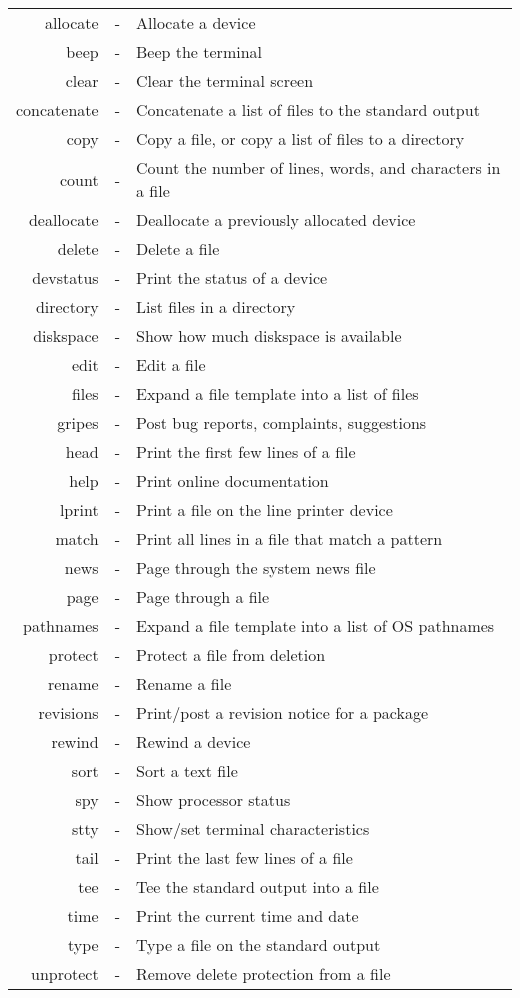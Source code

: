 \begin{tabular}{rcl}

       allocate & - & Allocate a device \\
	   beep & - & Beep the terminal \\
	  clear & - & Clear the terminal screen \\
    concatenate & - & Concatenate a list of files to the standard output \\
	   copy & - & Copy a file, or copy a list of files to a directory \\
	  count & - & Count the number of lines, words, and characters in a file \\
     deallocate & - & Deallocate a previously allocated device \\
         delete & - & Delete a file \\
      devstatus & - & Print the status of a device \\
      directory & - & List files in a directory \\
      diskspace & - & Show how much diskspace is available \\
	   edit & - & Edit a file \\
	  files & - & Expand a file template into a list of files \\
         gripes & - & Post bug reports, complaints, suggestions \\
	   head & - & Print the first few lines of a file \\
           help & - & Print online documentation \\
         lprint & - & Print a file on the line printer device \\
	  match & - & Print all lines in a file that match a pattern \\
	   news & - & Page through the system news file \\
	   page & - & Page through a file \\
      pathnames & - & Expand a file template into a list of OS pathnames \\
        protect & - & Protect a file from deletion \\
         rename & - & Rename a file \\
      revisions & - & Print/post a revision notice for a package \\
         rewind & - & Rewind a device \\
	   sort & - & Sort a text file \\
	    spy & - & Show processor status \\
	   stty & - & Show/set terminal characteristics \\
	   tail & - & Print the last few lines of a file \\
	    tee & - & Tee the standard output into a file \\
	   time & - & Print the current time and date \\
	   type & - & Type a file on the standard output \\
      unprotect & - & Remove delete protection from a file
\end{tabular}
\clearpage

